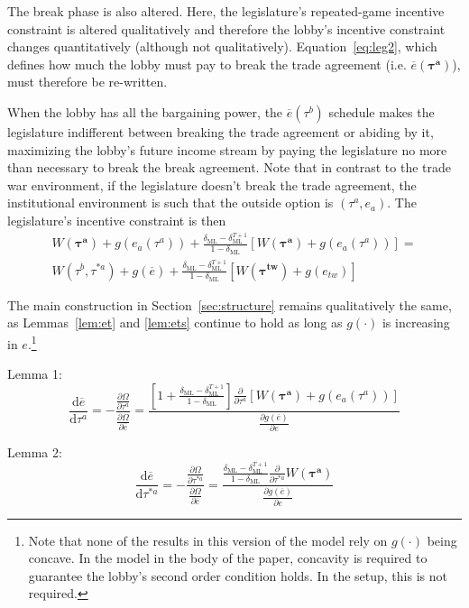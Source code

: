 \documentclass[authoryear, review]{elsarticle}
\newcommand{\ov}{\overline}
\newcommand{\bta}{\bm{\tau^a}}
\newcommand{\btw}{\bm{\tau^{tw}}}
\newcommand{\de}{\delta}
\begin{document}
The break phase is also altered. Here, the legislature's repeated-game incentive constraint is altered qualitatively and therefore the lobby's incentive constraint changes quantitatively (although not qualitatively). Equation~\ref{eq:leg2}, which defines how much the lobby must pay to break the trade agreement (i.e. $\ov{e}(\bta)$), must therefore be re-written.

When the lobby has all the bargaining power, the $\ov{e}(\tau^b)$ schedule makes the legislature indifferent between breaking the trade agreement or abiding by it, maximizing the lobby's future income stream by paying the legislature no more than necessary to break the break agreement. Note that in contrast to the trade war environment, if the legislature doesn't break the trade agreement, the institutional environment is such that the outside option is $\left(\tau^a,e_a\right)$. The legislature's incentive constraint is then
	\begin{multline}
		W(\bta) + g(e_a(\tau^a)) + \frac{\de_\text{ML} - \de_\text{ML}^{T+1}}{1-\de_\text{ML}}\left[W(\bta) + g(e_a(\tau^a))\right] = \\
	W(\tau^b,\tau^{*a}) +g(\ov{e}) + \frac{\de_\text{ML} - \de_\text{ML}^{T+1}}{1-\de_\text{ML}} \left[W(\btw) + g(e_{tw})\right]
		\label{eq:newleg}
	\end{multline}
					
The main construction in Section~\ref{sec:structure} remains qualitatively the same, as Lemmas~\ref{lem:et} and \ref{lem:ets} continue to hold as long as $g(\cdot)$ is increasing in $e$.\footnote{Note that none of the results in this version of the model rely on $g(\cdot)$ being concave. In the model in the body of the paper, concavity is required to guarantee the lobby's second order condition holds. In the \citet{dgh97} setup, this is not required.} 
					
Lemma 1:
	\begin{equation*}
		\frac{\mathrm{d} \ov{e}}{\mathrm{d} \tau^a} = -\frac{\frac{\partial \Omega}{\partial \tau^a}}{\frac{\partial \Omega}{\partial \ov{e}}} =
	\textstyle \frac{\left[1+ \frac{\de_\text{ML} - \de_\text{ML}^{T+1}}{1-\de_\text{ML}}  \right]\frac{\partial}{\partial \tau^a}\left[W(\bta) + g(e_a(\tau^a))\right]}{\frac{\partial g(\ov{e})}{\partial e} }
  \end{equation*}
							
Lemma 2:
	\begin{equation*}
		\frac{\mathrm{d} \ov{e}}{\mathrm{d} \tau^{*a}} = -\frac{\frac{\partial \Omega}{\partial \tau^{*a}}}{\frac{\partial \Omega}{\partial \ov{e}}} =
	\textstyle \frac{\frac{\de_\text{ML} - \de_\text{ML}^{T+1}}{1-\de_\text{ML}}  \frac{\partial}{\partial \tau^{*a}}W(\bta)}{\frac{\partial g(\ov{e})}{\partial e} }
	\end{equation*}
							
\end{document}

